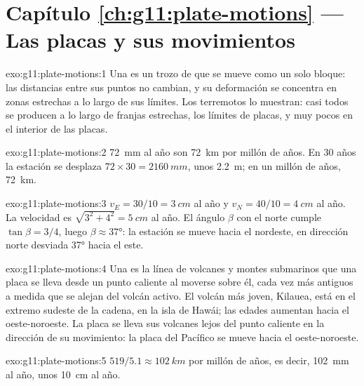 \section*{Capítulo \ref{ch:g11:plate-motions} --- Las placas y sus movimientos}

\begin{solution}{exo:g11:plate-motions:1}
Una  es un trozo de  que se mueve como un solo bloque:
las distancias entre sus puntos no cambian, y su deformación se concentra en
zonas estrechas a lo largo de sus límites. Los terremotos lo muestran: casi
todos se producen a lo largo de franjas estrechas, los límites de placas, y
muy pocos en el interior de las placas.
\end{solution}

\begin{solution}{exo:g11:plate-motions:2}
\qty{72}{mm} al año son \qty{72}{km} por millón de años. En 30 años la
estación se desplaza $72 \times 30 = \qty{2160}{mm}$, unos \qty{2.2}{m}; en un
millón de años, \qty{72}{km}.
\end{solution}

\begin{solution}{exo:g11:plate-motions:3}
$v_E = 30/10 = \qty{3}{cm}$ al año y $v_N = 40/10 = \qty{4}{cm}$ al año. La
velocidad es $\sqrt{3^2 + 4^2} = \qty{5}{cm}$ al año. El ángulo $\beta$ con el
norte cumple $\tan\beta = 3/4$, luego $\beta \approx \ang{37}$: la estación se
mueve hacia el nordeste, en dirección norte desviada \ang{37} hacia el este.
\end{solution}

\begin{solution}{exo:g11:plate-motions:4}
Una  es la línea de volcanes y montes submarinos que
una placa se lleva desde un punto caliente al moverse sobre él, cada vez más
antiguos a medida que se alejan del volcán activo. El volcán más joven,
Kilauea, está en el extremo sudeste de la cadena, en la isla de Hawái; las
edades aumentan hacia el oeste-noroeste. La placa se lleva sus volcanes lejos
del punto caliente en la dirección de su movimiento: la placa del Pacífico se
mueve hacia el oeste-noroeste.
\end{solution}

\begin{solution}{exo:g11:plate-motions:5}
$519/5.1 \approx \qty{102}{km}$ por millón de años, es decir, \qty{102}{mm}
al año, unos \qty{10}{cm} al año.
\end{solution}

